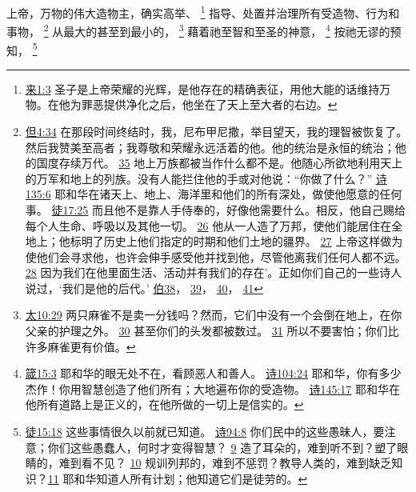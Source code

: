 \documentclass[12pt, a4paper, oneside]{ctexart}
\newcounter{parnum}[section]
\newcommand{\N}{%
   \noindent\refstepcounter{parnum}%
    \makebox[\parindent][l]{\textbf{\arabic{parnum}.}}}
\begin{document}
\N 上帝，万物的伟大造物主，确实高举、
	\footnote {
		\href{https://biblehub.com/hebrews/1-3.htm}{来1:3} 圣子是上帝荣耀的光辉，是他存在的精确表征，用他大能的话维持万物。在他为罪恶提供净化之后，他坐在了天上至大者的右边。
	}
	指导、处置并治理所有受造物、行为和事物，
	\footnote {
		\href{https://biblehub.com/daniel/4-34.htm}{但4:34} 在那段时间终结时，我，尼布甲尼撒，举目望天，我的理智被恢复了。然后我赞美至高者；我尊敬和荣耀永远活着的他。他的统治是永恒的统治；他的国度存续万代。
		\href{https://biblehub.com/daniel/4-35.htm}{35} 地上万族都被当作什么都不是。他随心所欲地利用天上的万军和地上的列族。没有人能拦住他的手或对他说：“你做了什么？”
		\href{https://biblehub.com/psalms/135-6.htm}{诗135:6} 耶和华在诸天上、地上、海洋里和他们的所有深处，做使他愿意的任何事。
		\href{https://biblehub.com/acts/17-25.htm}{徒17:25} 而且他不是靠人手侍奉的，好像他需要什么。相反，他自己赐给每个人生命、呼吸以及其他一切。 
		\href{https://biblehub.com/acts/17-26.htm}{26} 他从一人造了万邦，使他们能居住在全地上；他标明了历史上他们指定的时期和他们土地的疆界。
		\href{https://biblehub.com/acts/17-27.htm}{27} 上帝这样做为使他们会寻求他，也许会伸手感受他并找到他，尽管他离我们任何人都不远。
		\href{https://biblehub.com/acts/17-28.htm}{28} 因为我们在他里面生活、活动并有我们的存在’。正如你们自己的一些诗人说过，‘我们是他的后代。’
		\href{https://biblehub.com/niv/job/38.htm}{伯38}，
		\href{https://biblehub.com/niv/job/39.htm}{39}，
		\href{https://biblehub.com/niv/job/40.htm}{40}，
		\href{https://biblehub.com/niv/job/41.htm}{41}
	}
	从最大的甚至到最小的，
	\footnote {
		\href{https://biblehub.com/matthew/10-29.htm}{太10:29} 两只麻雀不是卖一分钱吗？然而，它们中没有一个会倒在地上，在你父亲的护理之外。
		\href{https://biblehub.com/matthew/10-30.htm}{30} 甚至你们的头发都被数过。
		\href{https://biblehub.com/matthew/10-31.htm}{31} 所以不要害怕；你们比许多麻雀更有价值。
	}
	藉着祂至智和至圣的神意，
	\footnote {
		\href{https://biblehub.com/proverbs/15-3.htm}{箴15:3} 耶和华的眼无处不在，看顾恶人和善人。
		\href{https://biblehub.com/psalms/104-24.htm}{诗104:24} 耶和华，你有多少杰作！你用智慧创造了他们所有；大地遍布你的受造物。
		\href{https://biblehub.com/psalms/145-17.htm}{诗145:17} 耶和华在他所有道路上是正义的，在他所做的一切上是信实的。
	}
	按祂无谬的预知，
	\footnote {
		\href{https://biblehub.com/acts/15-18.htm}{徒15:18} 这些事情很久以前就已知道。
		\href{https://biblehub.com/psalms/94-8.htm}{诗94:8} 你们民中的这些愚昧人，要注意；你们这些愚蠢人，何时才变得智慧？
		\href{https://biblehub.com/psalms/94-9.htm}{9} 造了耳朵的，难到听不到？塑了眼睛的，难到看不见？
		\href{https://biblehub.com/psalms/94-10.htm}{10} 规训列邦的，难到不惩罚？教导人类的，难到缺乏知识？\href{https://biblehub.com/psalms/94-11.htm}{11} 耶和华知道人所有计划；他知道它们是徒劳的。
	}
\end{document}
